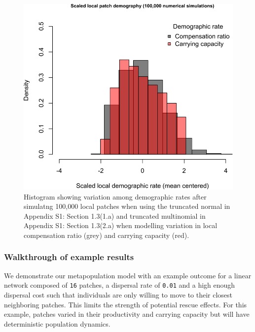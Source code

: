 \documentclass[
]{article}
\begin{document}
\begin{figure}[H]

{\centering \includegraphics{Managing_for_ecological_surprises_in_metapopulations_files/figure-latex/histogram of demographic variation-1} 

}

\caption{Histogram showing variation among demographic rates after simulatng 100,000 local patches when using the truncated normal in Appendix S1: Section 1.3(1.a) and truncated multinomial in Appendix S1: Section 1.3(2.a) when modelling variation in local compensation ratio (grey) and carrying capacity (red).}\label{fig:histogram of demographic variation}
\end{figure}

\hypertarget{walkthrough-of-example-results}{%
\subsubsection{Walkthrough of example
results}\label{walkthrough-of-example-results}}

We demonstrate our metapopulation model with an example outcome for a
linear network composed of \texttt{16} patches, a dispersal rate of
\texttt{0.01} and a high enough dispersal cost such that individuals are
only willing to move to their closest neighboring patches. This limits
the strength of potential rescue effects. For this example, patches
varied in their productivity and carrying capacity but will have
deterministic population dynamics.
\end{document}
